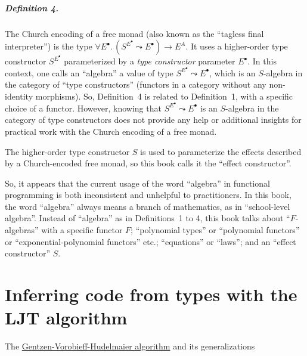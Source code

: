 \paragraph{Definition 4.}

The Church encoding of a free monad (also known as the \textsf{``}tagless
final interpreter\textsf{''}) is the type $\forall E^{\bullet}.\,(S^{E^{\bullet}}\leadsto E^{\bullet})\rightarrow E^{A}$.
It uses a higher-order type constructor $S^{E^{\bullet}}$ parameterized
by a \emph{type constructor} parameter $E^{\bullet}$. In this context,
one calls an \textsf{``}algebra\textsf{''} a value of type $S^{E^{\bullet}}\leadsto E^{\bullet}$,
which is an $S$-algebra in the category of \textsf{``}type constructors\textsf{''}
(functors in a category without any non-identity morphisms). So, Definition~4
is related to Definition~1, with a specific choice of a functor.
However, knowing that $S^{E^{\bullet}}\leadsto E^{\bullet}$ is an
$S$-algebra in the category of type constructors does not provide
any help or additional insights for practical work with the Church
encoding of a free monad.

The higher-order type constructor $S$ is used to parameterize the
effects described by a Church-encoded free monad, so this book calls
it the \textsf{``}effect constructor\textsf{''}.

So, it appears that the current usage of the word \textsf{``}algebra\textsf{''} in
functional programming is both inconsistent and unhelpful to practitioners.
In this book, the word \textsf{``}algebra\textsf{''} always means a branch of mathematics,
as in \textsf{``}school-level algebra\textsf{''}. Instead of \textsf{``}algebra\textsf{''} as in Definitions~1
to 4, this book talks about \textsf{``}$F$-algebras\textsf{''} with a specific functor
$F$; \textsf{``}polynomial types\textsf{''} or \textsf{``}polynomial functors\textsf{''} or \textsf{``}exponential-polynomial
functors\textsf{''} etc.; \textsf{``}equations\textsf{''} or \textsf{``}laws\textsf{''}; and an \textsf{``}effect
constructor\textsf{''} $S$.

\chapter{Inferring code from types with the LJT algorithm\label{app:CH-correspondence-LJT-algorithm}}

The \href{http://apt13.unibe.ch/slides/Dyckhoff.pdf}{Gentzen-Vorobieff-Hudelmaier algorithm}
and its generalizations

